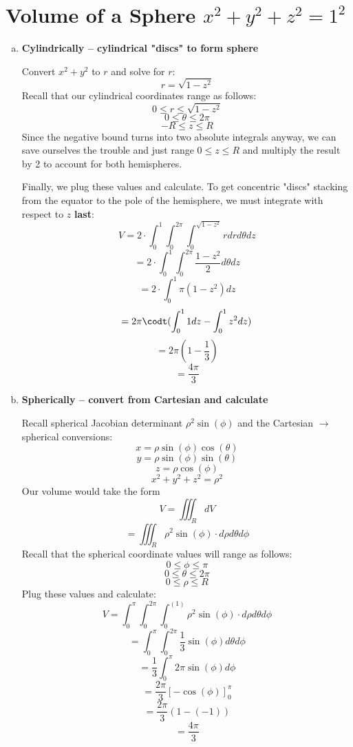 \documentclass{article}
\begin{document}
\section{Volume of a Sphere $x^2 + y^2 + z^2 = 1^2$}
\begin{enumerate}[a.]
	\item \textbf{Cylindrically -- cylindrical "discs" to form sphere}

	    Convert $x^2+y^2$ to $r$ and solve for $r$:
	    \[ r=\sqrt{1-z^2}\]
        Recall that our cylindrical coordinates range as follows:
        \[0 \leq r \leq \sqrt{1-z^2}\]
        \[0 \leq \theta \leq 2\pi \]
        \[-R \leq z \leq R \]
        Since the negative  bound turns into two absolute integrals anyway, we can save ourselves the trouble and just range $0 \leq z \leq R$ and multiply the result by 2 to account for both hemispheres.

        Finally, we plug these values and calculate. To get concentric "discs" stacking from the equator to the pole of the hemisphere, we must integrate with respect to $z$ \textbf{last}:
        \[ V = 2\cdot \int _0^1\int _0^{2\pi }\int _0^{\sqrt{1-z^2}}rdrd\theta dz \]
        \[ =2\cdot \int _0^1\int _0^{2\pi }\frac{1-z^2}{2}d\theta dz \]
        \[=2\cdot \int _0^1\pi \left(1-z^2\right)dz\]
        \[=2\pi\codt (\int _0^11dz-\int _0^1z^2dz)\]
        \[=2\pi\left(1-\frac{1}{3}\right)\]
        \[=\frac{4\pi }{3} \]

	\item \textbf{Spherically -- convert from Cartesian and calculate}

        Recall spherical Jacobian determinant $ \rho^2\sin(\phi) $ and the Cartesian $\rightarrow$ spherical conversions:
        \[ x = \rho\sin(\phi)\cos(\theta)   \]
        \[ y = \rho\sin(\phi)\sin(\theta)  \]
        \[ z = \rho\cos(\phi)  \]
        \[ x^2+y^2+z^2 = \rho^2 \]
        Our volume would take the form
        \[ V = \iiint_{R}dV \]
        \[ = \iiint_{R}\rho^2\sin(\phi) \cdot d\rho d\theta d\phi \]
        Recall that the spherical coordinate values will range as follows:
        \[ 0 \leq \phi \leq \pi  \]
        \[ 0 \leq \theta \leq 2\pi  \]
        \[ 0 \leq \rho \leq R \]
        Plug these values and calculate:
        \[ V = \int_{0}^{\pi}\int_{0}^{2\pi}\int_{0}^{(1)}\rho^2\sin(\phi) \cdot d\rho d\theta d\phi \]
        \[ = \int_{0}^{\pi}\int_{0}^{2\pi}\frac{1}{3}\sin(\phi) d\theta d\phi \]
        \[ = \frac{1}{3}\int_{0}^{\pi}2\pi\sin(\phi) d\phi \]
        \[ = \frac{2\pi}{3}\left[-\cos \left(\phi\right)\right]^{\pi }_0\]
        \[ = \frac{2\pi}{3}(1-\left(-1\right))\]
        \[ = \frac{4\pi}{3} \]


\end{enumerate}
\end{document}
